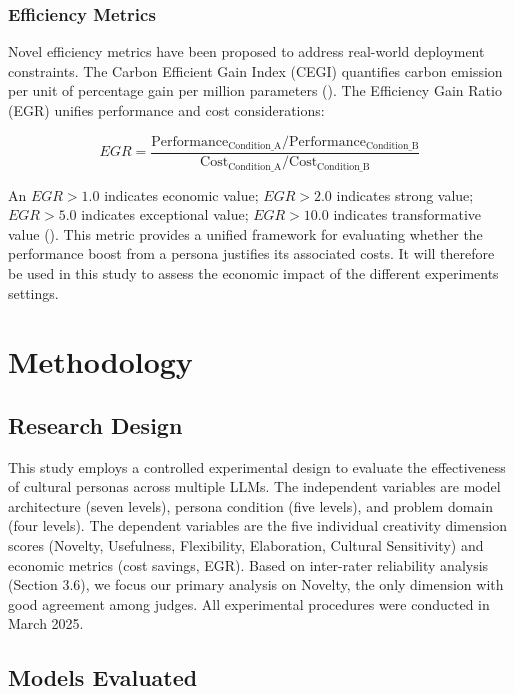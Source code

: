 \documentclass{article}
\begin{document}
\subsubsection{Efficiency Metrics}

Novel efficiency metrics have been proposed to address real-world deployment constraints. The Carbon Efficient Gain Index (CEGI) quantifies carbon emission per unit of percentage gain per million parameters (\cite{anuj_kumar_1c38e9e4}). The Efficiency Gain Ratio (EGR) unifies performance and cost considerations:

\begin{equation}
EGR = \frac{\text{Performance}_{\text{Condition\_A}} / \text{Performance}_{\text{Condition\_B}}}{\text{Cost}_{\text{Condition\_A}} / \text{Cost}_{\text{Condition\_B}}}
\end{equation}

An $EGR > 1.0$ indicates economic value; $EGR > 2.0$ indicates strong value; $EGR > 5.0$ indicates exceptional value; $EGR > 10.0$ indicates transformative value (\cite{your_name_5e6c21fb}). This metric provides a unified framework for evaluating whether the performance boost from a persona justifies its associated costs. It will therefore be used in this study to assess the economic impact of the different experiments settings.

\section{Methodology}

\subsection{Research Design}

This study employs a controlled experimental design to evaluate the effectiveness of cultural personas across multiple LLMs. The independent variables are model architecture (seven levels), persona condition (five levels), and problem domain (four levels). The dependent variables are the five individual creativity dimension scores (Novelty, Usefulness, Flexibility, Elaboration, Cultural Sensitivity) and economic metrics (cost savings, EGR). Based on inter-rater reliability analysis (Section 3.6), we focus our primary analysis on Novelty, the only dimension with good agreement among judges. All experimental procedures were conducted in March 2025.

\subsection{Models Evaluated}
\end{document}
